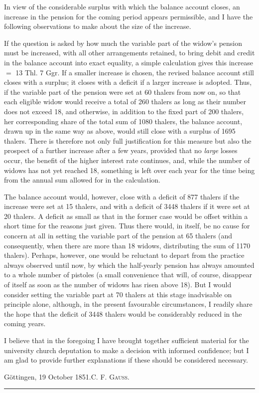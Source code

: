 In view of the considerable surplus with which the balance account closes, an increase in the pension for the coming period appears permissible, and I have the following observations to make about the size of the increase.

If the question is asked by how much the variable part of the widow's pension must be increased, with all other arrangements retained, to bring debit and credit in the balance account into exact equality, a simple calculation gives this increase \(=\) 13 Thl. 7 Ggr. If a smaller increase is chosen, the revised balance account still closes with a surplus; it closes with a deficit if a larger increase is adopted. Thus, if the variable part of the pension were set at 60 thalers from now on, so that each eligible widow would receive a total of 260 thalers as long as their number does not exceed 18, and otherwise, in addition to the fixed part of 200 thalers, her corresponding share of the total sum of 1080 thalers, the balance account, drawn up in the same way as above, would still close with a surplus of 1695 thalers. There is therefore not only full justification for this measure but also the prospect of a further increase after a few years, provided that no \textit{large} losses occur, the benefit of the higher interest rate continues, and, while the number of widows has not yet reached 18, something is left over each year for the time being from the annual sum allowed for in the calculation.

The balance account would, however, close with a deficit of 877 thalers if the increase were set at 15 thalers, and with a deficit of 3448 thalers if it were set at 20 thalers. A deficit as small as that in the former case would be offset within a short time for the reasons just given. Thus there would, in itself, be no cause for concern at all in setting the variable part of the pension at 65 thalers (and consequently, when there are more than 18 widows, distributing the sum of 1170 thalers). Perhaps, however, one would be reluctant to depart from the practice always observed until now, by which the half-yearly pension has always amounted to a whole number of pistoles (a small convenience that will, of course, disappear of itself as soon as the number of widows has risen above 18). But I would consider setting the variable part at 70 thalers at this stage inadvisable on principle alone, although, in the present favourable circumstances, I readily share the hope that the deficit of 3448 thalers would be considerably reduced in the coming years.

\medskip
I believe that in the foregoing I have brought together sufficient material for the university church deputation to make a decision with informed confidence; but I am glad to provide further explanations if these should be considered necessary.

Göttingen, 19 October 1851.\hfill C. F. \textsc{Gauss}.
\begin{center}\rule{.28\linewidth}{.3pt}\end{center}
